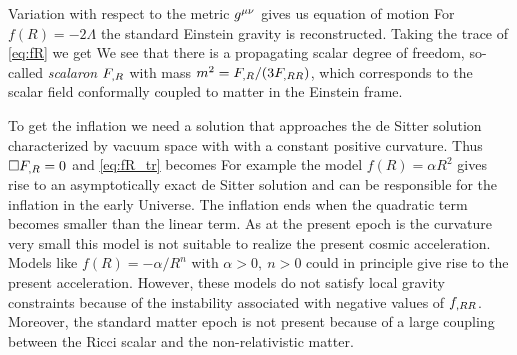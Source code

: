 Variation with respect to the metric $g^{\mu\nu}$ gives us equation of motion
For $f(R)=-2\Lambda$ the standard Einstein gravity is reconstructed. Taking the trace of \eqref{eq:fR} we get
We see that there is a propagating scalar degree of freedom, so-called \textit{scalaron} $F_{,R}$ with mass $m^2=F_{,R}/(3F_{,RR})$, which corresponds to the scalar field conformally coupled to matter in the Einstein frame.

To get the inflation we need a solution that approaches the de Sitter solution characterized by vacuum space with with a constant positive curvature. Thus $\Box F_{,R}=0$ and \eqref{eq:fR_tr} becomes
For example the model $f(R)=\alpha R^2$ gives rise to an asymptotically exact de Sitter solution and can be responsible for the inflation in the early Universe. The inflation ends when the quadratic term becomes smaller than the linear term. As at the present epoch is the curvature very small this model is not suitable to realize the present cosmic acceleration. Models like $f(R)=-\alpha/R^n$ with $\alpha>0,\ n>0$ could in principle give rise to the present acceleration. However, these models do not satisfy local gravity constraints because of the instability associated with negative values of $f_{,RR}$. Moreover, the standard matter epoch is not present because of a large coupling between the Ricci scalar and the non-relativistic matter.

